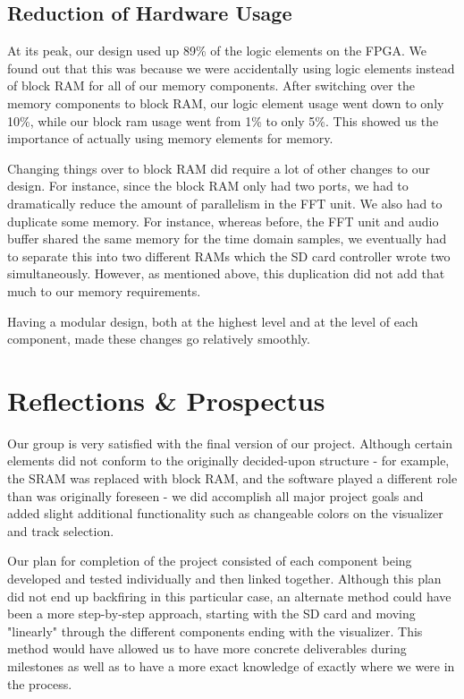 \documentclass{article}
\begin{document}
\subsection{Reduction of Hardware Usage}

At its peak, our design used up 89\% of the logic elements on the FPGA. 
We found out that this was because we were accidentally using logic elements 
instead of block RAM for all of our memory components. After switching over 
the memory components to block RAM, our logic element usage went down to only 
10\%, while our block ram usage went from 1\% to only 5\%. This showed us the 
importance of actually using memory elements for memory.

Changing things over to block RAM did require a lot of other changes to our 
design. For instance, since the block RAM only had two ports, we had to 
dramatically reduce the amount of parallelism in the FFT unit. We also had to 
duplicate some memory. For instance, whereas before, the FFT unit and audio 
buffer shared the same memory for the time domain samples, we eventually had 
to separate this into two different RAMs which the SD card controller wrote 
two simultaneously. However, as mentioned above, this duplication did not add 
that much to our memory requirements. 

Having a modular design, both at the highest level and at the level of each 
component, made these changes go relatively smoothly.

\section{Reflections \& Prospectus}

Our group is very satisfied with the final version of our project.  
Although certain elements did not conform to the originally decided-upon 
structure - for example, the SRAM was replaced with block RAM, and the software 
played a different role than was originally foreseen - we did accomplish all 
major project goals and added slight additional functionality such as 
changeable colors on the visualizer and track selection.

Our plan for completion of the project consisted of each component being 
developed and tested individually and then linked together. Although this plan 
did not end up backfiring in this particular case, an alternate method could 
have been a more step-by-step approach, starting with the SD card and moving 
"linearly" through the different components ending with the visualizer. This 
method would have allowed us to have more concrete deliverables during 
milestones as well as to have a more exact knowledge of exactly where we were 
in the process.
\end{document}
